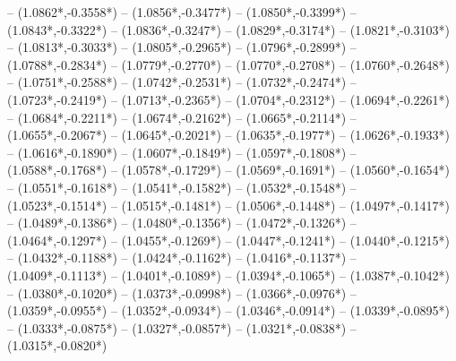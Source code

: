 {	-- ({1.0862*\dx},{-0.3558*\dy})
	-- ({1.0856*\dx},{-0.3477*\dy})
	-- ({1.0850*\dx},{-0.3399*\dy})
	-- ({1.0843*\dx},{-0.3322*\dy})
	-- ({1.0836*\dx},{-0.3247*\dy})
	-- ({1.0829*\dx},{-0.3174*\dy})
	-- ({1.0821*\dx},{-0.3103*\dy})
	-- ({1.0813*\dx},{-0.3033*\dy})
	-- ({1.0805*\dx},{-0.2965*\dy})
	-- ({1.0796*\dx},{-0.2899*\dy})
	-- ({1.0788*\dx},{-0.2834*\dy})
	-- ({1.0779*\dx},{-0.2770*\dy})
	-- ({1.0770*\dx},{-0.2708*\dy})
	-- ({1.0760*\dx},{-0.2648*\dy})
	-- ({1.0751*\dx},{-0.2588*\dy})
	-- ({1.0742*\dx},{-0.2531*\dy})
	-- ({1.0732*\dx},{-0.2474*\dy})
	-- ({1.0723*\dx},{-0.2419*\dy})
	-- ({1.0713*\dx},{-0.2365*\dy})
	-- ({1.0704*\dx},{-0.2312*\dy})
	-- ({1.0694*\dx},{-0.2261*\dy})
	-- ({1.0684*\dx},{-0.2211*\dy})
	-- ({1.0674*\dx},{-0.2162*\dy})
	-- ({1.0665*\dx},{-0.2114*\dy})
	-- ({1.0655*\dx},{-0.2067*\dy})
	-- ({1.0645*\dx},{-0.2021*\dy})
	-- ({1.0635*\dx},{-0.1977*\dy})
	-- ({1.0626*\dx},{-0.1933*\dy})
	-- ({1.0616*\dx},{-0.1890*\dy})
	-- ({1.0607*\dx},{-0.1849*\dy})
	-- ({1.0597*\dx},{-0.1808*\dy})
	-- ({1.0588*\dx},{-0.1768*\dy})
	-- ({1.0578*\dx},{-0.1729*\dy})
	-- ({1.0569*\dx},{-0.1691*\dy})
	-- ({1.0560*\dx},{-0.1654*\dy})
	-- ({1.0551*\dx},{-0.1618*\dy})
	-- ({1.0541*\dx},{-0.1582*\dy})
	-- ({1.0532*\dx},{-0.1548*\dy})
	-- ({1.0523*\dx},{-0.1514*\dy})
	-- ({1.0515*\dx},{-0.1481*\dy})
	-- ({1.0506*\dx},{-0.1448*\dy})
	-- ({1.0497*\dx},{-0.1417*\dy})
	-- ({1.0489*\dx},{-0.1386*\dy})
	-- ({1.0480*\dx},{-0.1356*\dy})
	-- ({1.0472*\dx},{-0.1326*\dy})
	-- ({1.0464*\dx},{-0.1297*\dy})
	-- ({1.0455*\dx},{-0.1269*\dy})
	-- ({1.0447*\dx},{-0.1241*\dy})
	-- ({1.0440*\dx},{-0.1215*\dy})
	-- ({1.0432*\dx},{-0.1188*\dy})
	-- ({1.0424*\dx},{-0.1162*\dy})
	-- ({1.0416*\dx},{-0.1137*\dy})
	-- ({1.0409*\dx},{-0.1113*\dy})
	-- ({1.0401*\dx},{-0.1089*\dy})
	-- ({1.0394*\dx},{-0.1065*\dy})
	-- ({1.0387*\dx},{-0.1042*\dy})
	-- ({1.0380*\dx},{-0.1020*\dy})
	-- ({1.0373*\dx},{-0.0998*\dy})
	-- ({1.0366*\dx},{-0.0976*\dy})
	-- ({1.0359*\dx},{-0.0955*\dy})
	-- ({1.0352*\dx},{-0.0934*\dy})
	-- ({1.0346*\dx},{-0.0914*\dy})
	-- ({1.0339*\dx},{-0.0895*\dy})
	-- ({1.0333*\dx},{-0.0875*\dy})
	-- ({1.0327*\dx},{-0.0857*\dy})
	-- ({1.0321*\dx},{-0.0838*\dy})
	-- ({1.0315*\dx},{-0.0820*\dy})
}
